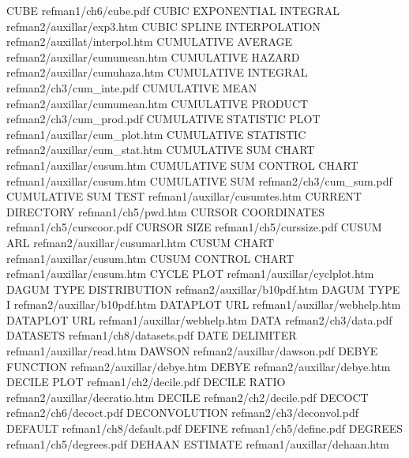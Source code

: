 CUBE                                    refman1/ch6/cube.pdf
CUBIC EXPONENTIAL INTEGRAL              refman2/auxillar/exp3.htm
CUBIC SPLINE INTERPOLATION              refman2/auxillat/interpol.htm
CUMULATIVE AVERAGE                      refman2/auxillar/cumumean.htm
CUMULATIVE HAZARD                       refman2/auxillar/cumuhaza.htm
CUMULATIVE INTEGRAL                     refman2/ch3/cum_inte.pdf
CUMULATIVE MEAN                         refman2/auxillar/cumumean.htm
CUMULATIVE PRODUCT                      refman2/ch3/cum_prod.pdf
CUMULATIVE STATISTIC PLOT               refman1/auxillar/cum_plot.htm
CUMULATIVE STATISTIC                    refman2/auxillar/cum_stat.htm
CUMULATIVE SUM CHART                    refman1/auxillar/cusum.htm
CUMULATIVE SUM CONTROL CHART            refman1/auxillar/cusum.htm
CUMULATIVE SUM                          refman2/ch3/cum_sum.pdf
CUMULATIVE SUM TEST                     refman1/auxillar/cusumtes.htm
CURRENT DIRECTORY                       refman1/ch5/pwd.htm
CURSOR COORDINATES                      refman1/ch5/curscoor.pdf
CURSOR SIZE                             refman1/ch5/curssize.pdf
CUSUM ARL                               refman2/auxillar/cusumarl.htm
CUSUM CHART                             refman1/auxillar/cusum.htm
CUSUM CONTROL CHART                     refman1/auxillar/cusum.htm
CYCLE PLOT                              refman1/auxillar/cyclplot.htm
DAGUM TYPE DISTRIBUTION                 refman2/auxillar/b10pdf.htm
DAGUM TYPE I                            refman2/auxillar/b10pdf.htm
DATAPLOT URL                            refman1/auxillar/webhelp.htm
DATAPLOT URL                            refman1/auxillar/webhelp.htm
DATA                                    refman2/ch3/data.pdf
DATASETS                                refman1/ch8/datasets.pdf
DATE DELIMITER                          refman1/auxillar/read.htm
DAWSON                                  refman2/auxillar/dawson.pdf
DEBYE FUNCTION                          refman2/auxillar/debye.htm
DEBYE                                   refman2/auxillar/debye.htm
DECILE PLOT                             refman1/ch2/decile.pdf
DECILE RATIO                            refman2/auxillar/decratio.htm
DECILE                                  refman2/ch2/decile.pdf
DECOCT                                  refman2/ch6/decoct.pdf
DECONVOLUTION                           refman2/ch3/deconvol.pdf
DEFAULT                                 refman1/ch8/default.pdf
DEFINE                                  refman1/ch5/define.pdf
DEGREES                                 refman1/ch5/degrees.pdf
DEHAAN ESTIMATE                         refman1/auxillar/dehaan.htm
